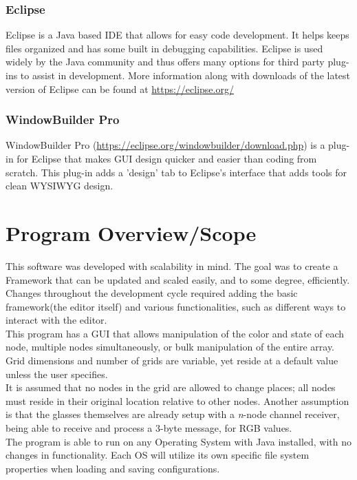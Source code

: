 \documentclass[12pt]{article}
\begin{document}
		\subsubsection{Eclipse}
  		Eclipse is a Java based IDE that allows for easy code development. It helps keeps files organized and has some built in debugging capabilities. Eclipse is used widely by the Java community and thus offers many options for third party plug-ins to assist in development. More information along with downloads of the latest version of Eclipse can be found at \url{https://eclipse.org/}
		
		\subsubsection{WindowBuilder Pro}
  		WindowBuilder Pro (\url{https://eclipse.org/windowbuilder/download.php}) is a plug-in for Eclipse that makes GUI design quicker and easier than coding from scratch. This plug-in adds a 'design' tab to Eclipse's interface that adds tools for clean WYSIWYG design. 
		
\newpage
	\section{Program Overview/Scope}
  	This software was developed with scalability in mind. The goal was to create a Framework that can be updated and scaled easily, and to some degree, efficiently. Changes throughout the development cycle required adding the basic framework(the editor itself) and various functionalities, such as different ways to interact with the editor. \\
    This program has a GUI that allows manipulation of the color and state of each node, multiple nodes simultaneously, or bulk manipulation of the entire array. Grid dimensions and number of grids are variable, yet reside at a default value unless the user specifies. \\
    It is assumed that no nodes in the grid are allowed to change places; all nodes must reside in their original location relative to other nodes. Another assumption is that the glasses themselves are already setup with a \textit{n}-node channel receiver, being able to receive and process a $3$-byte message, for RGB values.
    \\
    The program is able to run on any Operating System with Java installed, with no changes in functionality. Each OS will utilize its own specific file system properties when loading and saving configurations.
	
\end{document}
